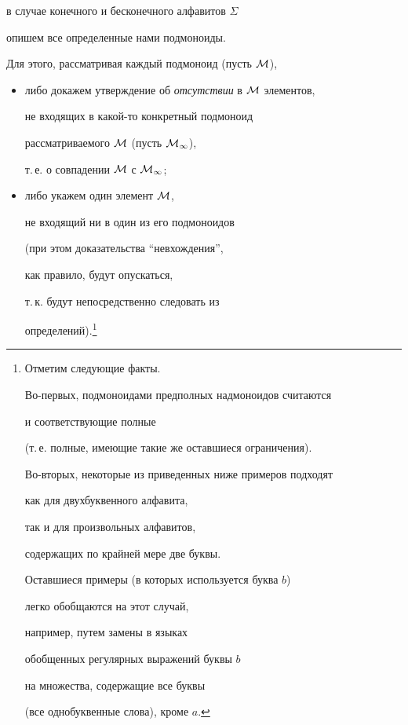  в случае конечного и бесконечного алфавитов $\Sigma$


 опишем все определенные нами подмоноиды.


 Для этого, рассматривая каждый подмоноид (пусть $\cal{M}$),


 \begin{itemize}


\item[--] либо докажем утверждение об {\it отсутствии\/} в $\cal{M}$ элементов,


 не входящих в какой-то конкретный подмоноид


 рассматриваемого $\cal{M}$ (пусть $\cal{M}_1$),


 т.\,е. о совпадении $\cal{M}$ с $\cal{M}_1$;


\item[--] либо укажем один элемент $\cal{M}$,


 не входящий ни в один из его подмоноидов


 (при этом доказательства ``невхождения'',


 как правило, будут опускаться,


т.\,к. будут непосредственно следовать из 


определений).\footnote{Отметим следующие факты.


Во-первых, подмоноидами предполных надмоноидов считаются


и соответствующие полные


(т.\,е. полные, имеющие такие же оставшиеся ограничения).


Во-вторых, некоторые из приведенных ниже примеров подходят


как для двухбуквенного алфавита,


так и для произвольных алфавитов,


содержащих по крайней мере две буквы.


Оставшиеся примеры (в которых используется буква $b$)


легко обобщаются на этот случай,


например, путем замены в языках


обобщенных регулярных выражений буквы $b$


на множества, содержащие все буквы


(все однобуквенные слова), кроме $a$.}


\end{itemize}


\setcounter{footnote}{0}





